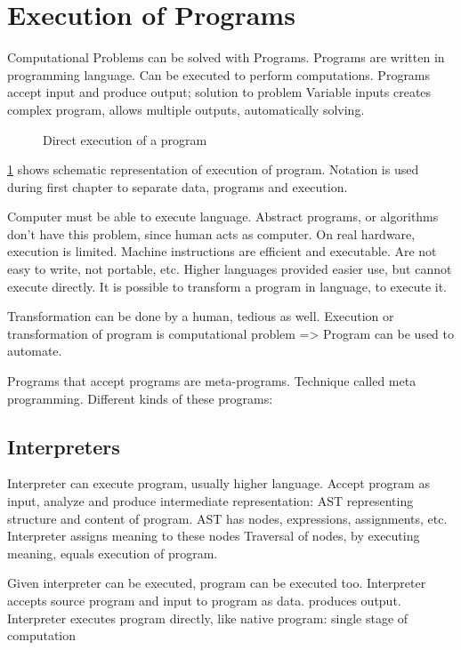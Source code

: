 
\section{Execution of Programs}\label{chap:programs}

Computational Problems can be solved with Programs.
Programs are written in programming language.
Can be executed to perform computations.
Programs accept input and produce output; solution to problem
Variable inputs creates complex program, allows multiple outputs, automatically solving.

\begin{figure}
  \centering
  
  \caption{Direct execution of a program}\label{fig:native-program}
\end{figure}

\ref{fig:native-program} shows schematic representation of execution of program.
Notation is used during first chapter to separate data, programs and execution.

Computer must be able to execute language.
Abstract programs, or algorithms don't have this problem, since human acts as computer.
On real hardware, execution is limited.
Machine instructions are efficient and executable.
Are not easy to write, not portable, etc.
Higher languages provided easier use, but cannot execute directly.
It is possible to transform a program in language, to execute it.

Transformation can be done by a human, tedious as well.
Execution or transformation of program is computational problem
=> Program can be used to automate.

Programs that accept programs are meta-programs.
Technique called meta programming.
Different kinds of these programs:



\subsection{Interpreters}

Interpreter can execute program, usually higher language.
Accept program as input, analyze and produce intermediate representation:
AST representing structure and content of program.
AST has nodes, expressions, assignments, etc.
Interpreter assigns meaning to these nodes
Traversal of nodes, by executing meaning, equals execution of program.

Given interpreter can be executed, program can be executed too.
Interpreter accepts source program and input to program as data.
produces output.
Interpreter executes program directly, like native program: single stage of computation


